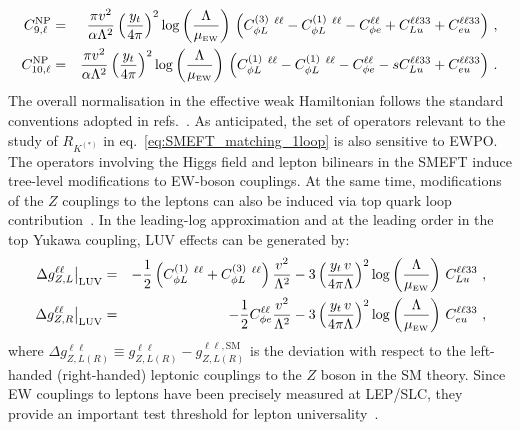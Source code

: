 \begin{eqnarray} 
	\label{eq:_C9_C10}
	C_{9,\ell}^{\rm NP}&=& \frac{\pi v^{2}}{\alpha \Lambda^2} \left(\frac{y_{t} }{4 \pi}\right)^2 \log \left( \frac{\Lambda}{\mu_{\textrm{\tiny{EW}}}} \right)   \, \left(C_{\phi L}^{(3)}\ ^{\ell \ell}-C_{\phi L}^{(1)}\ ^{\ell \ell}-C^{\ell \ell}_{\phi e}+ C_{Lu}^{\ell \ell 3 3} + C_{eu}^{\ell \ell 3 3} \right)\,,\nonumber \\
	C_{10,\ell}^{\rm NP}&=& \frac{\pi v^{2}}{\alpha \Lambda^2} \left(\frac{y_{t} }{4 \pi}\right)^2 \log \left( \frac{\Lambda}{\mu_{\textrm{\tiny{EW}}}} \right)   \, \left(C_{\phi L}^{(1)}\ ^{\ell \ell}-C_{\phi L}^{(1)}\ ^{\ell \ell}-C^{\ell \ell}_{\phi e}-s C_{Lu}^{\ell \ell 3 3} + C_{eu}^{\ell \ell 3 3} \right)\, .
\end{eqnarray} 
The overall normalisation in the effective weak Hamiltonian follows the standard conventions adopted in refs.~\cite{Ciuchini:2015qxb,Ciuchini:2017mik,Ciuchini:2019usw}.
As anticipated, the set of operators relevant to the study of $R_{K^{(*)}}$ in eq.~\eqref{eq:SMEFT_matching_1loop} is also sensitive to EWPO.  The operators involving the Higgs field and lepton bilinears in the SMEFT induce tree-level modifications to EW-boson couplings. At the same time, modifications of the $Z$ couplings to the leptons can also be induced via top quark loop
contribution~\cite{deBlas:2015aea}. In the leading-log approximation and at the leading order in the top Yukawa coupling, LUV effects can be generated by:
%
\begin{eqnarray}
	\label{eq:OLuedRGE}
	\left.\Delta g_{Z,L}^{\ell\ell}\right|_{\mathrm{LUV}} & = &
	- \frac 12 \left( C_{\phi L}^{(1)}\ ^{\ell \ell} +C_{\phi L}^{(3)}\ ^{\ell \ell} \right)\frac{v^2}{\Lambda^2}-
	3 \left( \frac{ y_t \, v}{4 \pi \Lambda} \right)^2 \log\left(\frac{\Lambda}{\mu_{\textrm{\tiny{EW}}}} \right) \, C_{Lu}^{\ell\ell33}  \ , \\ \nonumber
	\left.\Delta g_{Z,R}^{\ell\ell}\right|_{\mathrm{LUV}} & = & 
	- \frac 12 C^{\ell\ell}_{\phi e}\frac{v^2}{\Lambda^2}-
	3 \left( \frac{ y_t \, v}{4 \pi \Lambda} \right)^2 \log\left(\frac{\Lambda }{\mu_{\textrm{\tiny{EW}}}}\right) \, C_{eu}^{\ell\ell33} \ ,
\end{eqnarray}
where $\Delta g_{Z,L (R)}^{\ell\ell} \equiv g_{Z,L(R)}^{\ell\ell} - g_{Z,L (R)}^{\ell\ell,\textrm{SM}}$ is the deviation with respect to the left-handed (right-handed) leptonic couplings to the $Z$ boson in the SM theory. Since EW couplings to leptons have been precisely measured at LEP/SLC, they provide an important test threshold for lepton universality~\cite{Efrati:2015eaa,deBlas:2016ojx}.\\

